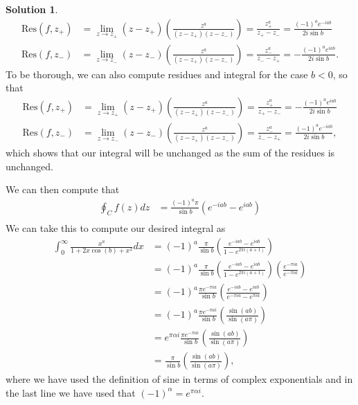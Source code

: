 \documentclass[12pt]{article}
\newcommand{\Res}{\text{Res}}
\theoremstyle{definition}
\newtheorem{sol}{Solution}
\theoremstyle{remark}
\begin{document}
\begin{sol}
    \begin{align}
        \Res(f, z_+) &= \lim_{z\to z_+} (z-z_+)\left(\frac{z^a}{(z-z_+)(z-z_-)} \right) = \frac{z_+^a}{z_+ - z_-} = \frac{(-1)^a e^{-iab}}{2i \sin b} \\
        \Res(f, z_-) &= \lim_{z\to z_-} (z-z_-)\left(\frac{z^a}{(z-z_+)(z-z_-)} \right) = \frac{z_-^a}{z_- - z_+} = -\frac{(-1)^a e^{iab}}{2i\sin b}. 
    \end{align}
  To be thorough, we can also compute residues and integral for the case $b<0$, so that
    \begin{align}
        \Res(f, z_+) &= \lim_{z\to z_+} (z-z_+)\left(\frac{z^a}{(z-z_+)(z-z_-)} \right) = \frac{z_+^a}{z_+ - z_-} = -\frac{(-1)^a e^{iab}}{2i \sin b} \\
        \Res(f, z_-) &= \lim_{z\to z_-} (z-z_-)\left(\frac{z^a}{(z-z_+)(z-z_-)} \right) = \frac{z_-^a}{z_- - z_+} = \frac{(-1)^a e^{-iab}}{2i\sin b},
    \end{align}
    which shows that our integral will be unchanged as the sum of the residues is unchanged.

    We can then compute that 
\begin{align}  
    \oint_C f(z)dz &= \frac{(-1)^a\pi}{\sin b}\left( e^{-iab} - e^{iab}\right)\\
  \end{align}
  We can take this to compute our desired integral as
  \begin{align}
      \int_{0}^{\infty} \frac{x^a}{1+2x\cos(b)+x^2}dx  &= (-1)^a \frac{\pi}{\sin b} \left( \frac{e^{-iab} - e^{iab}}{1-e^{2\pi i (a+1)}}\right)\\
                                                       &=  (-1)^a \frac{\pi}{\sin b} \left( \frac{e^{-iab} - e^{iab}}{1-e^{2\pi i (a+1)}}\right) \left( \frac{e^{-\pi i a}}{e^{-\pi i a}} \right)\\
                                                       &=  (-1)^a \frac{\pi e^{-\pi i a}}{\sin b} \left( \frac{e^{-iab} - e^{iab}}{e^{-\pi i a}-e^{\pi ia}}\right)\\
                                                       &= (-1)^a \frac{\pi e^{-\pi a i}}{\sin b} \left( \frac{\sin(ab)}{\sin(a\pi )} \right)\\
                                                       &= e^{\pi \alpha i} \frac{\pi e^{-\pi a i}}{\sin b} \left( \frac{\sin(ab)}{\sin(a\pi )} \right)\\
                                                       &= \frac{\pi}{\sin b} \left( \frac{\sin(ab)}{\sin(a\pi )} \right),
  \end{align}
where we have used the definition of sine in terms of complex exponentials and in the last line we have used that $(-1)^\alpha = e^{\pi \alpha i}$.
\end{sol}
\end{document}
